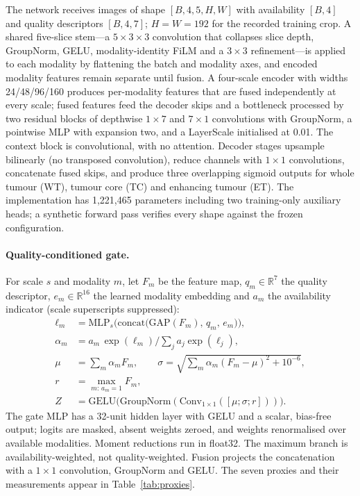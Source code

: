 The network receives images of shape $[B,4,5,H,W]$ with availability $[B,4]$ and quality descriptors $[B,4,7]$; $H{=}W{=}192$ for the recorded training crop. A shared five-slice stem---a $5{\times}3{\times}3$ convolution that collapses slice depth, GroupNorm, GELU, modality-identity FiLM and a $3{\times}3$ refinement---is applied to each modality by flattening the batch and modality axes, and encoded modality features remain separate until fusion. A four-scale encoder with widths 24/48/96/160 produces per-modality features that are fused independently at every scale; fused features feed the decoder skips and a bottleneck processed by two residual blocks of depthwise $1{\times}7$ and $7{\times}1$ convolutions with GroupNorm, a pointwise MLP with expansion two, and a LayerScale initialised at 0.01. The context block is convolutional, with no attention. Decoder stages upsample bilinearly (no transposed convolution), reduce channels with $1{\times}1$ convolutions, concatenate fused skips, and produce three overlapping sigmoid outputs for whole tumour (WT), tumour core (TC) and enhancing tumour (ET). The implementation has 1{,}221{,}465 parameters including two training-only auxiliary heads; a synthetic forward pass verifies every shape against the frozen configuration.

\paragraph{Quality-conditioned gate.}
For scale $s$ and modality $m$, let $F_m$ be the feature map, $q_m\in\mathbb{R}^7$ the quality descriptor, $e_m\in\mathbb{R}^{16}$ the learned modality embedding and $a_m$ the availability indicator (scale superscripts suppressed):
\begin{align}
\ell_m &= \mathrm{MLP}_s\!\big(\mathrm{concat}\big(\mathrm{GAP}(F_m),\,q_m,\,e_m\big)\big),\\
\alpha_m &= a_m\,\exp(\ell_m)\Big/\textstyle\sum_j a_j\exp(\ell_j),\\
\mu &= \textstyle\sum_m \alpha_m F_m,\qquad
\sigma = \sqrt{\textstyle\sum_m \alpha_m (F_m-\mu)^2 + 10^{-6}},\\
r &= \max_{m:\,a_m=1} F_m,\\
Z &= \mathrm{GELU}\!\big(\mathrm{GroupNorm}(\mathrm{Conv}_{1\times1}([\mu;\sigma;r]))\big).
\end{align}
The gate MLP has a 32-unit hidden layer with GELU and a scalar, bias-free output; logits are masked, absent weights zeroed, and weights renormalised over available modalities. Moment reductions run in float32. The maximum branch is availability-weighted, not quality-weighted. Fusion projects the concatenation with a $1{\times}1$ convolution, GroupNorm and GELU. The seven proxies and their measurements appear in Table~\ref{tab:proxies}.

